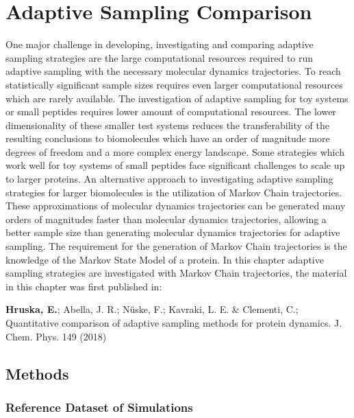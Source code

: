 

\afterpage{\null\newpage}
\chapter{Adaptive Sampling Comparison\label{ch:chapter32}}

One major challenge in developing, investigating and comparing adaptive sampling strategies are the large computational resources required to run adaptive sampling with the necessary molecular dynamics trajectories. To reach statistically significant sample sizes requires even larger computational resources which are rarely available.
The investigation of adaptive sampling for toy systems or small peptides requires lower amount of computational resources. The lower dimensionality of these smaller test systems reduces the transferability of the resulting conclusions to biomolecules which have an order of magnitude more degrees of freedom and a more complex energy landscape. Some strategies which work well for toy systems of small peptides face significant challenges to scale up to larger proteins. 
An alternative approach to investigating adaptive sampling strategies for larger biomolecules is the utilization of Markov Chain trajectories. These approximations of molecular dynamics trajectories can be generated many orders of magnitudes faster than molecular dynamics trajectories, allowing a better sample size than generating molecular dynamics trajectories for adaptive sampling. The requirement for the generation of Markov Chain trajectories is the knowledge of the Markov State Model of a protein.  In this chapter adaptive sampling strategies are investigated with Markov Chain trajectories, the material in this chapter was first published in: 

\cite{Adstrategies2018} \textbf{Hruska, E.}; Abella, J. R.; N\"uske, F.;
Kavraki, L. E. \& Clementi, C.; Quantitative
comparison of adaptive sampling methods
for protein dynamics. J. Chem. Phys. 149 (2018) 



\section{\label{sec:methods}Methods}


\subsection{\label{sec:methods-dataset}Reference Dataset of Simulations}

